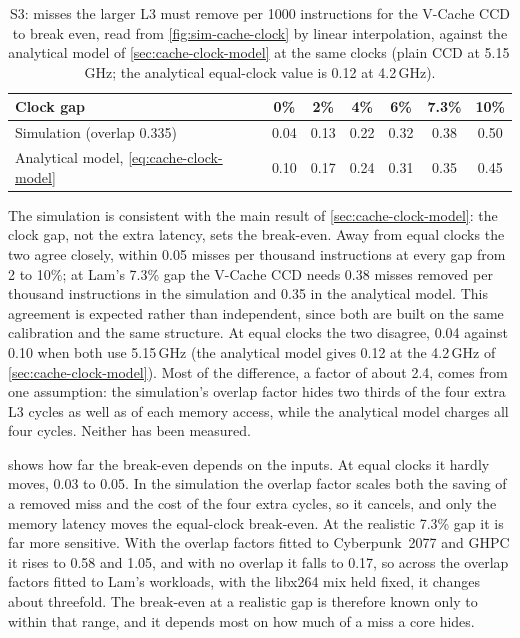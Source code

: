 \begin{table}[htbp]
  \centering
  \caption[S3: break-even misses removed for each clock gap]{S3: misses the larger L3 must remove per 1000 instructions for the V-Cache CCD to break even, read from \cref{fig:sim-cache-clock} by linear interpolation, against the analytical model of \cref{sec:cache-clock-model} at the same clocks (plain CCD at 5.15\,GHz; the analytical equal-clock value is 0.12 at 4.2\,GHz).}
  \label{tab:sim-breakeven}
  \small
  \begin{tabular}{@{}lcccccc@{}}
    \toprule
    \textbf{Clock gap} & 0\% & 2\% & 4\% & 6\% & 7.3\% & 10\% \\
    \midrule
    Simulation (overlap 0.335) & 0.04 & 0.13 & 0.22 & 0.32 & 0.38 & 0.50 \\
    Analytical model, \cref{eq:cache-clock-model} & 0.10 & 0.17 & 0.24 & 0.31 & 0.35 & 0.45 \\
    \bottomrule
  \end{tabular}
\end{table}

The simulation is consistent with the main result of \cref{sec:cache-clock-model}: the clock gap, not the extra latency, sets the break-even. Away from equal clocks the two agree closely, within 0.05 misses per thousand instructions at every gap from 2 to 10\%; at Lam's 7.3\% gap the V-Cache CCD needs 0.38 misses removed per thousand instructions in the simulation and 0.35 in the analytical model. This agreement is expected rather than independent, since both are built on the same calibration and the same structure. At equal clocks the two disagree, 0.04 against 0.10 when both use 5.15\,GHz (the analytical model gives 0.12 at the 4.2\,GHz of \cref{sec:cache-clock-model}). Most of the difference, a factor of about 2.4, comes from one assumption: the simulation's overlap factor hides two thirds of the four extra L3 cycles as well as of each memory access, while the analytical model charges all four cycles. Neither has been measured.

 shows how far the break-even depends on the inputs. At equal clocks it hardly moves, 0.03 to 0.05. In the simulation the overlap factor scales both the saving of a removed miss and the cost of the four extra cycles, so it cancels, and only the memory latency moves the equal-clock break-even. At the realistic 7.3\% gap it is far more sensitive. With the overlap factors fitted to Cyberpunk~2077 and GHPC it rises to 0.58 and 1.05, and with no overlap it falls to 0.17, so across the overlap factors fitted to Lam's workloads, with the libx264 mix held fixed, it changes about threefold. The break-even at a realistic gap is therefore known only to within that range, and it depends most on how much of a miss a core hides.

